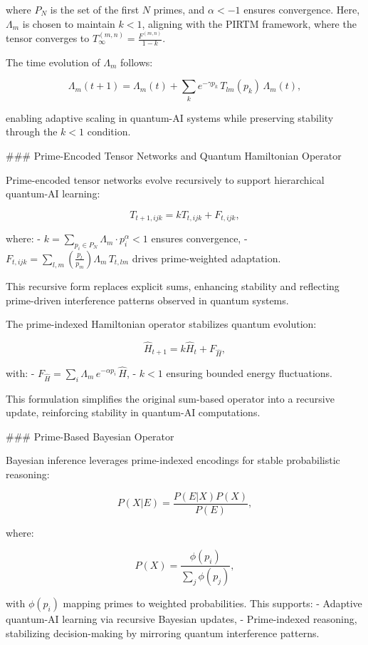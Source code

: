 \documentclass{article}
\theoremstyle{plain}
\begin{document}
where \( P_N \) is the set of the first \( N \) primes, and \(\alpha < -1\) ensures convergence. Here, \(\Lambda_m\) is chosen to maintain \( k < 1 \), aligning with the PIRTM framework, where the tensor converges to \( T_\infty^{(m,n)} = \frac{F^{(m,n)}}{1 - k} \).

The time evolution of \(\Lambda_m\) follows:

\[
\Lambda_m(t+1) = \Lambda_m(t) + \sum_{k} e^{-\gamma p_k} \, T_{lm}(p_k) \, \Lambda_m(t),
\]

enabling adaptive scaling in quantum-AI systems while preserving stability through the \( k < 1 \) condition.

### Prime-Encoded Tensor Networks and Quantum Hamiltonian Operator

Prime-encoded tensor networks evolve recursively to support hierarchical quantum-AI learning:

\[
T_{t+1,ijk} = k T_{t,ijk} + F_{t,ijk},
\]

where:
- \( k = \sum_{p_i \in P_N} \Lambda_m \cdot p_i^\alpha < 1 \) ensures convergence,
- \( F_{t,ijk} = \sum_{l,m} \left( \frac{p_l}{p_m} \right) \Lambda_m \, T_{t,lm} \) drives prime-weighted adaptation.

This recursive form replaces explicit sums, enhancing stability and reflecting prime-driven interference patterns observed in quantum systems.

The prime-indexed Hamiltonian operator stabilizes quantum evolution:

\[
\hat{H}_{t+1} = k \hat{H}_t + F_{\hat{H}},
\]

with:
- \( F_{\hat{H}} = \sum_{i} \Lambda_m \, e^{-\alpha p_i} \, \hat{H} \),
- \( k < 1 \) ensuring bounded energy fluctuations.

This formulation simplifies the original sum-based operator into a recursive update, reinforcing stability in quantum-AI computations.

### Prime-Based Bayesian Operator

Bayesian inference leverages prime-indexed encodings for stable probabilistic reasoning:

\[
P(X | E) = \frac{P(E | X) P(X)}{P(E)},
\]

where:

\[
P(X) = \frac{\phi(p_i)}{\sum_{j} \phi(p_j)},
\]

with \(\phi(p_i)\) mapping primes to weighted probabilities. This supports:
- Adaptive quantum-AI learning via recursive Bayesian updates,
- Prime-indexed reasoning, stabilizing decision-making by mirroring quantum interference patterns.
\end{document}
